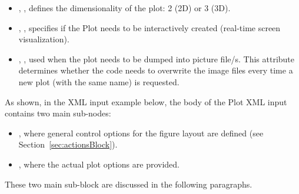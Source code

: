 \vspace{-5mm}
\begin{itemize}
  \itemsep0em
  \item {}, , defines the
  dimensionality of the plot: 2 (2D) or 3 (3D).
  \item {}, , specifies if
  the Plot needs to be interactively created (real-time screen visualization).
  \item {}, , used when the
  plot needs to be dumped into picture file/s. This attribute determines whether
  the code needs to overwrite the image files every time a new plot (with the
  same name) is requested.
\end{itemize}
\vspace{-5mm}

As shown, in the XML input example below, the body of the Plot XML input
contains two main sub-nodes:
\vspace{-5mm}
\begin{itemize}
  \itemsep0em
  \item {}, where general control options for the figure layout
  are defined (see Section~\ref{sec:actionsBlock}).
  \item {}, where the actual plot options are provided.
  \vspace{-5mm}
\end{itemize}

These two main sub-block are discussed in the following paragraphs.
%
